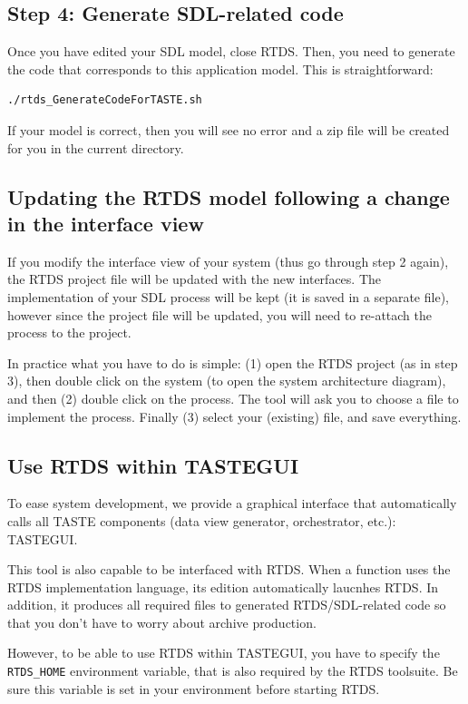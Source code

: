 \documentclass[11pt]{book}
\begin{document}
   \subsection{Step 4: Generate SDL-related code}

   Once you have edited your SDL model, close RTDS. Then, you need to generate
   the code that corresponds to this application model. This is straightforward: 

   \begin{verbatim}
./rtds_GenerateCodeForTASTE.sh
   \end{verbatim}

   If your model is correct, then you will see no error and a zip file will be created
   for you in the current directory.

   \subsection{Updating the RTDS model following a change in the interface view}
   If you modify the interface view of your system (thus go through step 2 again),
   the RTDS project file will be updated with the new interfaces. The implementation
   of your SDL process will be kept (it is saved in a separate file), however since the
   project file will be updated, you will need to re-attach the process to the project.
   
   In practice what you have to do is simple: (1) open the RTDS project (as in step 3),
   then double click on the system (to open the system architecture diagram), and then
   (2) double click on the process. The tool will ask you to choose a file to implement the
   process. Finally (3) select your (existing) file, and save everything. 


   \subsection{Use RTDS within TASTEGUI}
   To ease system development, we provide a graphical interface that
   automatically calls all TASTE components (data view generator, orchestrator,
   etc.): TASTEGUI.

   This tool is also capable to be interfaced with RTDS. When a function uses
   the RTDS implementation language, its edition automatically laucnhes RTDS. In
   addition, it produces all required files to generated RTDS/SDL-related code
   so that you don't have to worry about archive production.

   However, to be able to use RTDS within TASTEGUI, you have to specify the
   \texttt{RTDS\_HOME} environment variable, that is also required by the RTDS
   toolsuite. Be sure this variable is set in your environment before starting
   RTDS.
\end{document}
